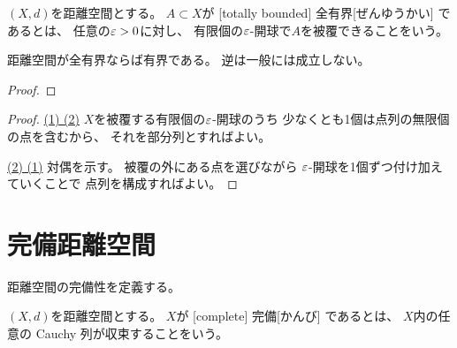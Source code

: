 \documentclass[report]{jlreq}
\begin{document}
\begin{definition}[全有界]
    $(X, d)$を距離空間とする。
    $A \subset X$が
    [totally bounded]
        {全有界}[ぜんゆうかい]
    であるとは、
    任意の$\varepsilon > 0$に対し、
    有限個の$\varepsilon$-開球で$A$を被覆できることをいう。
\end{definition}

\begin{proposition}[全有界ならば有界]
    距離空間が全有界ならば有界である。
    逆は一般には成立しない。
\end{proposition}

\begin{proof}
    \TODO{}
\end{proof}


\begin{proof}
    \uline{(1) \Rightarrow (2)} \quad
    $X$を被覆する有限個の$\varepsilon$-開球のうち
    少なくとも1個は点列の無限個の点を含むから、
    それを部分列とすればよい。

    \uline{(2) \Rightarrow (1)} \quad
    対偶を示す。
    被覆の外にある点を選びながら
    $\varepsilon$-開球を1個ずつ付け加えていくことで
    点列を構成すればよい。
\end{proof}

%
\section{完備距離空間}

距離空間の完備性を定義する。

\begin{definition}[完備]
    $(X, d)$を距離空間とする。
    $X$が
    [complete]
        {完備}[かんび]
    であるとは、
    $X$内の任意の Cauchy 列が収束することをいう。
\end{definition}
\end{document}
